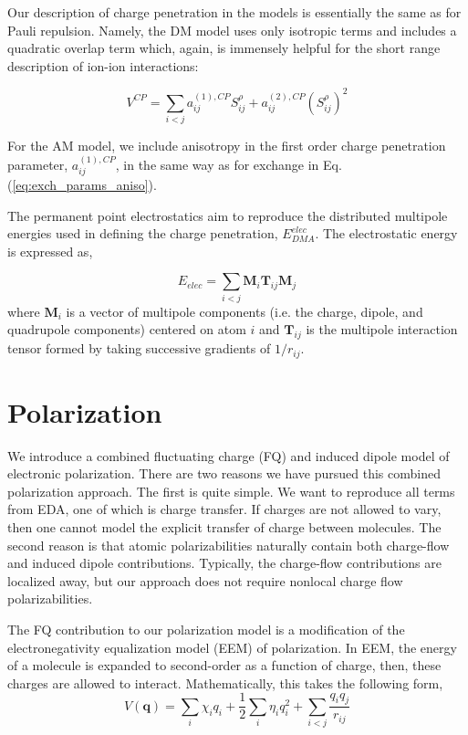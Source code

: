 \documentclass[journal=jacsat,manuscript=article]{achemso}
\begin{document}
Our description of charge penetration in the models is essentially
the same as for Pauli repulsion. Namely, the DM model uses only
isotropic terms and includes a quadratic overlap term which, again,
is immensely helpful for the short range description of ion-ion interactions:

\begin{equation}
  V^{CP} = \sum_{i<j}a_{ij}^{(1),CP}S_{ij}^\rho+a_{ij}^{(2),CP}(S_{ij}^\rho)^2
  \label{eq:exch_iso}
\end{equation}

For the AM model, we include anisotropy in the first order charge penetration
parameter, $a_{ij}^{(1),CP}$, in the same way as for exchange in Eq. (\ref{eq:exch_params_aniso}).

The permanent point electrostatics aim to reproduce the distributed
multipole energies used in defining the charge penetration, $E^{elec}_{DMA}$.
The electrostatic energy is expressed as,

\begin{equation}
  E_{elec} = \sum_{i<j}\mathbf{M}_i\mathbf{T}_{ij}\mathbf{M}_j
  \label{eq:elec}
\end{equation}
\noindent
where $\mathbf{M}_i$ is a vector of multipole components (i.e. the charge,
dipole, and quadrupole components) centered on atom $i$ and $\mathbf{T}_{ij}$ is
the multipole interaction tensor formed by taking successive gradients of $1/r_{ij}$\cite{stone2013theory}.

\section*{Polarization}

We introduce a combined fluctuating charge (FQ) and induced dipole model of electronic
polarization. There are two reasons we have pursued this combined polarization
approach. The first is quite simple. We want to reproduce all terms from EDA,
one of which is charge transfer. If charges are not allowed to vary, then one
cannot model the explicit transfer of charge between molecules. The second reason is
that atomic polarizabilities naturally contain both charge-flow and induced dipole
contributions.\cite{stone1985distributedb} Typically, the charge-flow contributions
are localized away\cite{ruth1994localization}, but our approach does not require nonlocal
charge flow polarizabilities.

The FQ contribution to our polarization model is a modification of the electronegativity
equalization model (EEM) of polarization.\cite{mortier1986electronegativity} In EEM,
the energy of a molecule is expanded to second-order as a function of charge, then,
these charges are allowed to interact. Mathematically, this takes the following form,
\begin{equation}
  V(\bm{q})=\sum_i \chi_i q_i + \frac12 \sum_i \eta_i q_i^2 + \sum_{i<j} \frac{q_i q_j}{r_{ij}}
  \label{eq:eem}
\end{equation}
\end{document}
